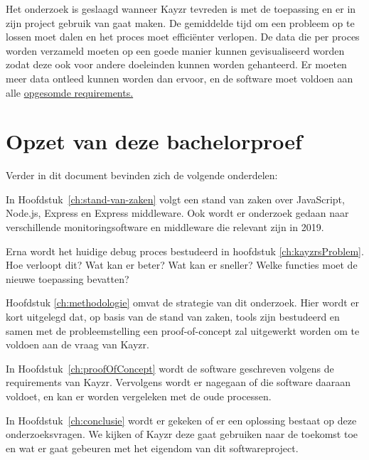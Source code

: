 Het onderzoek is geslaagd wanneer Kayzr tevreden is met de toepassing en er in zijn project gebruik van gaat maken. De gemiddelde tijd om een probleem op te lossen moet dalen en het proces moet efficiënter verlopen. De data die per proces worden verzameld moeten op een goede manier kunnen gevisualiseerd worden zodat deze ook voor andere doeleinden kunnen worden gehanteerd. Er moeten meer data ontleed kunnen worden dan ervoor, en de software moet voldoen aan alle \hyperref[sec:requirements]{opgesomde requirements.}


\section{Opzet van deze bachelorproef}
\label{sec:opzet-bachelorproef}


Verder in dit document bevinden zich de volgende onderdelen:

In Hoofdstuk~\ref{ch:stand-van-zaken} volgt een stand van zaken over JavaScript, Node.js, Express en Express middleware. Ook wordt er onderzoek gedaan naar verschillende monitoringsoftware en middleware die relevant zijn in 2019.

Erna wordt het huidige debug proces bestudeerd in hoofdstuk \ref{ch:kayzrsProblem}. Hoe verloopt dit? Wat kan er beter? Wat kan er sneller? Welke functies moet de nieuwe toepassing bevatten?

Hoofdstuk \ref{ch:methodologie} omvat de strategie van dit onderzoek. Hier wordt er kort uitgelegd dat, op basis van de stand van zaken, tools zijn bestudeerd en samen met de probleemstelling een proof-of-concept zal uitgewerkt worden om te voldoen aan de vraag van Kayzr.

In Hoofdstuk~\ref{ch:proofOfConcept} wordt de software geschreven volgens de requirements van Kayzr. Vervolgens wordt er nagegaan of die software daaraan voldoet, en kan er worden vergeleken met de oude processen.

In Hoofdstuk~\ref{ch:conclusie} wordt er gekeken of er een oplossing bestaat op deze onderzoeksvragen. We kijken of Kayzr deze gaat gebruiken naar de toekomst toe en wat er gaat gebeuren met het eigendom van dit softwareproject.

